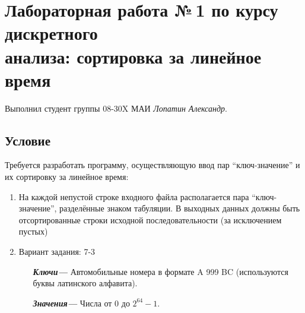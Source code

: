 \documentclass[12pt]{article}
\begin{document}
\section*{Лабораторная работа №\,1 по курсу дискретного\\ анализа: сортировка за линейное время}

Выполнил студент группы 08-30X МАИ \textit{Лопатин Александр}.
\subsection*{Условие}

Требуется разработать программу, осуществляющую ввод пар ``ключ-значение'' и их сортировку за линейное время: 
\begin{enumerate}
\item На каждой непустой строке входного файла располагается пара ``ключ-значение'', разделённые знаком табуляции. В выходных данных должны быть отсортированные строки исходной последовательности (за исключением пустых)
\item Вариант задания: 7-3
\begin{itemize}

 \item[\textbf{ \it Ключи---}] Автомобильные номера в формате A 999 BC (используются буквы латинского алфавита).
 \item[\textbf{ \it Значения---}] Числа от 0 до $2^{64} - 1$.

\end{itemize}
\end{enumerate}
\end{document}
